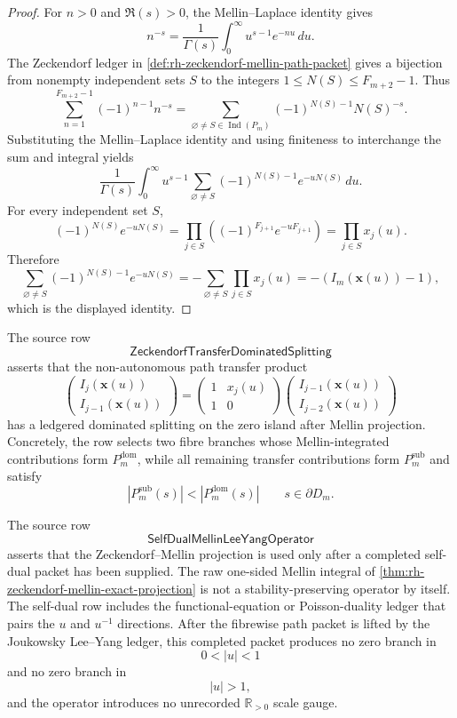 \begin{proof}
For $n>0$ and $\Re(s)>0$, the Mellin--Laplace identity gives
$$
n^{-s}
=
\frac1{\Gamma(s)}
\int_0^{\infty}u^{s-1}e^{-nu}\,du.
$$
The Zeckendorf ledger in
\autoref{def:rh-zeckendorf-mellin-path-packet} gives a bijection from
nonempty independent sets $S$ to the integers
$1\le N(S)\le F_{m+2}-1$.  Thus
$$
\sum_{n=1}^{F_{m+2}-1}(-1)^{n-1}n^{-s}
=
\sum_{\varnothing\neq S\in\operatorname{Ind}(P_m)}
(-1)^{N(S)-1}N(S)^{-s}.
$$
Substituting the Mellin--Laplace identity and using finiteness to
interchange the sum and integral yields
$$
\frac1{\Gamma(s)}
\int_0^{\infty}
u^{s-1}
\sum_{\varnothing\neq S}
(-1)^{N(S)-1}e^{-uN(S)}\,du.
$$
For every independent set $S$,
$$
(-1)^{N(S)}e^{-uN(S)}
=
\prod_{j\in S}
\left((-1)^{F_{j+1}}e^{-uF_{j+1}}\right)
=
\prod_{j\in S}x_j(u).
$$
Therefore
$$
\sum_{\varnothing\neq S}
(-1)^{N(S)-1}e^{-uN(S)}
=
-\sum_{\varnothing\neq S}\prod_{j\in S}x_j(u)
=
-\left(I_m(\mathbf x(u))-1\right),
$$
which is the displayed identity.
\end{proof}

\begin{definition}
\label{def:rh-zeckendorf-transfer-dominated-splitting}
The source row
$$
\mathsf{ZeckendorfTransferDominatedSplitting}
$$
asserts that the non-autonomous path transfer product
$$
\begin{pmatrix}
I_j(\mathbf x(u))\\
I_{j-1}(\mathbf x(u))
\end{pmatrix}
=
\begin{pmatrix}
1&x_j(u)\\
1&0
\end{pmatrix}
\begin{pmatrix}
I_{j-1}(\mathbf x(u))\\
I_{j-2}(\mathbf x(u))
\end{pmatrix}
$$
has a ledgered dominated splitting on the zero island after Mellin
projection.  Concretely, the row selects two fibre branches whose
Mellin-integrated contributions form
$P_m^{\mathrm{dom}}$, while all remaining transfer contributions form
$P_m^{\mathrm{sub}}$ and satisfy
$$
|P_m^{\mathrm{sub}}(s)|<|P_m^{\mathrm{dom}}(s)|
\qquad
s\in\partial D_m.
$$
\end{definition}

\begin{definition}
\label{def:rh-mellin-lee-yang-stability-operator}
The source row
$$
\mathsf{SelfDualMellinLeeYangOperator}
$$
asserts that the Zeckendorf--Mellin projection is used only after a
completed self-dual packet has been supplied.  The raw one-sided Mellin
integral of \autoref{thm:rh-zeckendorf-mellin-exact-projection} is not a
stability-preserving operator by itself.  The self-dual row includes the
functional-equation or Poisson-duality ledger that pairs the $u$ and
$u^{-1}$ directions.  After the fibrewise path packet is lifted by the
Joukowsky Lee--Yang ledger, this completed packet produces no zero
branch in
$$
0<|u|<1
$$
and no zero branch in
$$
|u|>1,
$$
and the operator introduces no unrecorded $\mathbb R_{>0}$ scale gauge.
\end{definition}

